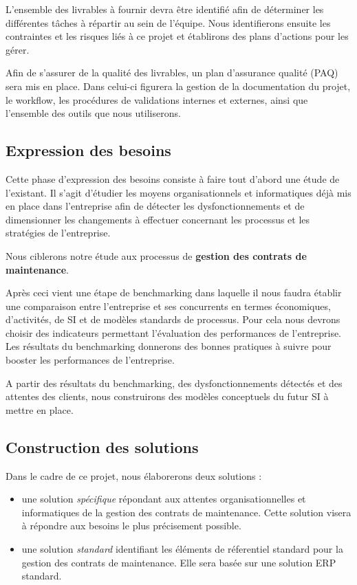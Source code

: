 L'ensemble des livrables à fournir devra être identifié afin de déterminer les différentes tâches à répartir au sein de l'équipe.
Nous identifierons ensuite les contraintes et les risques liés à ce projet et établirons des plans d'actions pour les gérer.

Afin de s'assurer de la qualité des livrables, un plan d'assurance qualité (PAQ) sera mis en place. Dans celui-ci figurera la gestion de la documentation du projet,
le workflow, les procédures de validations internes et externes, ainsi que l'ensemble des outils que nous utiliserons.

\subsection{Expression des besoins}


Cette phase d'expression des besoins consiste à faire tout d'abord une étude de l'existant.
Il s'agit d'étudier les moyens organisationnels et informatiques déjà mis en place dans l'entreprise afin de détecter les dysfonctionnements et de dimensionner les changements à effectuer concernant les processus et les stratégies de l'entreprise.

Nous ciblerons notre étude aux processus de \textbf{gestion des contrats de maintenance}.

Après ceci vient une étape de benchmarking dans laquelle il nous faudra établir une comparaison entre l'entreprise et ses concurrents en termes économiques, d'activités, de SI et de modèles standards de processus.
Pour cela nous devrons choisir des indicateurs permettant l'évaluation des performances de l'entreprise. Les résultats du benchmarking donnerons des bonnes pratiques à suivre pour booster les performances de l'entreprise.

A partir des résultats du benchmarking, des dysfonctionnements détectés et des attentes des clients, nous construirons des modèles conceptuels du futur SI à mettre en place.


\subsection{Construction des solutions}

Dans le cadre de ce projet, nous élaborerons deux solutions :

\begin{itemize}
 \item une solution \textit{spécifique} répondant aux attentes organisationnelles et informatiques de la gestion des contrats de maintenance. Cette solution visera à répondre aux besoins le plus précisement possible.
 \item une solution \textit{standard} identifiant les éléments de réferentiel standard pour la gestion des contrats de maintenance. Elle sera basée sur une solution ERP standard.
\end{itemize}

